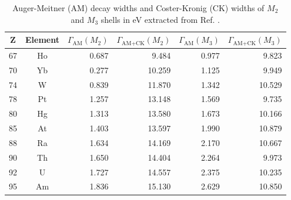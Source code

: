 \begin{table*}[h]
 \caption{Auger-Meitner (AM) decay widths and Coster-Kronig (CK) widths
          of $M_2$ and $M_3$ shells in \unit{eV} extracted from
          Ref. \cite{Chen83}.}
 \begin{tabular}{ccrrrr}
 \toprule
 Z & Element & $\Gamma_\text{AM}(M_2)$ & $\Gamma_\text{AM+CK}(M_2)$ & $\Gamma_\text{AM}(M_3)$ & $\Gamma_\text{AM+CK}(M_3)$ \\
 \midrule
 67 & Ho &  0.687 &  9.484 & 0.977 &  9.823\\
 70 & Yb &  0.277 & 10.259 & 1.125 &  9.949 \\
 74 & W  &  0.839 & 11.870 & 1.342 & 10.529 \\
 78 & Pt &  1.257 & 13.148 & 1.569 &  9.735 \\
 80 & Hg &  1.313 & 13.580 & 1.673 & 10.166 \\
 85 & At &  1.403 & 13.597 & 1.990 & 10.879 \\
 88 & Ra &  1.634 & 14.169 & 2.170 & 10.667 \\
 90 & Th &  1.650 & 14.404 & 2.264 &  9.973 \\
 92 & U  &  1.727 & 14.557 & 2.375 & 10.235 \\
 95 & Am &  1.836 & 15.130 & 2.629 & 10.850 \\
 \bottomrule
 \end{tabular}
 \label{tab:M}
\end{table*}
